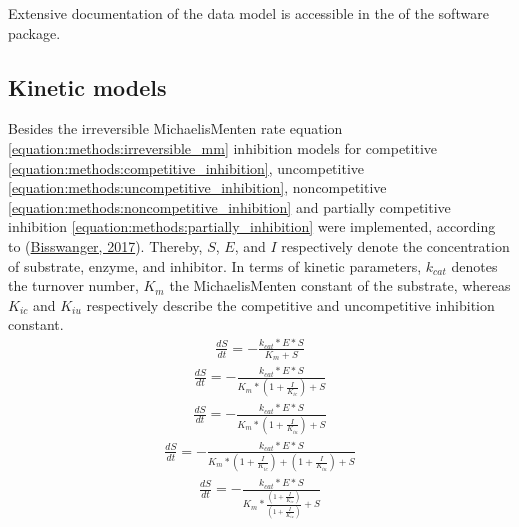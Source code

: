 \documentclass[letterpaper,12pt,english]{jupyterBook}
\begin{document}
\sphinxAtStartPar
Extensive documentation of the data model is accessible in the  of the software package.


\subsection{Kinetic models}
\label{\detokenize{methods:kinetic-models}}
\sphinxAtStartPar
Besides the irreversible Michaelis\sphinxhyphen{}Menten rate equation \eqref{equation:methods:irreversible_mm} inhibition models for competitive \eqref{equation:methods:competitive_inhibition}, uncompetitive \eqref{equation:methods:uncompetitive_inhibition}, non\sphinxhyphen{}competitive \eqref{equation:methods:noncompetitive_inhibition} and partially competitive inhibition \eqref{equation:methods:partially_inhibition} were implemented, according to (\hyperlink{cite.references:id5}{Bisswanger, 2017}). Thereby, \(S\), \(E\), and \(I\) respectively denote the concentration of substrate, enzyme, and inhibitor. In terms of kinetic parameters, \(k_{cat}\) denotes the turnover number, \(K_{m}\) the Michaelis\sphinxhyphen{}Menten constant of the substrate, whereas \(K_{ic}\) and \(K_{iu}\) respectively describe the competitive and uncompetitive inhibition constant.
\begin{equation}\label{equation:methods:irreversible_mm}
\begin{split}\frac{dS}{dt} = -\frac{k_{cat} * E * S}{K_{m} + S}\end{split}
\end{equation}\begin{equation}\label{equation:methods:competitive_inhibition}
\begin{split}\frac{dS}{dt} = -\frac{k_{cat} * E * S}{K_{m} * (1+\frac{I}{K_{ic}}) + S}\end{split}
\end{equation}\begin{equation}\label{equation:methods:uncompetitive_inhibition}
\begin{split}\frac{dS}{dt} = -\frac{k_{cat} * E * S}{K_{m} * (1+\frac{I}{K_{iu}}) + S}\end{split}
\end{equation}\begin{equation}\label{equation:methods:noncompetitive_inhibition}
\begin{split}\frac{dS}{dt} = -\frac{k_{cat} * E * S}{K_{m} * (1+\frac{I}{K_{ic}}) + (1+\frac{I}{K_{iu}}) + S}\end{split}
\end{equation}\begin{equation}\label{equation:methods:partially_inhibition}
\begin{split}\frac{dS}{dt} = -\frac{k_{cat} * E * S}{K_{m} * \frac{(1+\frac{I}{K_{ic}})}{(1+\frac{I}{K_{iu}})} + S}\end{split}
\end{equation}
\end{document}
